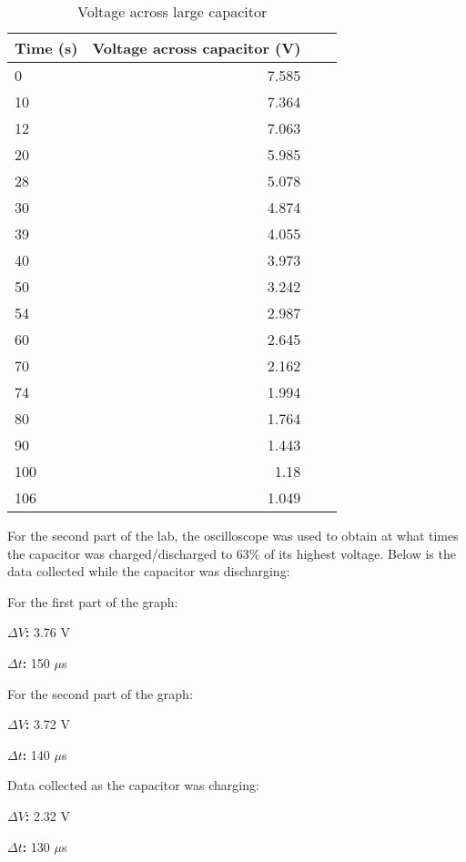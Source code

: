 \documentclass [12pt, letterpaper, twoside] {article}
\begin{document}
\begin{table}
  \centering
  \begin{tabular}{| l | r | r | r |}
    \hline\hline
    Time (s) & Voltage across capacitor (V) \\
    \hline
    0 & 7.585 \\
    \hline
    10 & 7.364 \\
    \hline
    12 & 7.063 \\
    \hline
    20 & 5.985 \\
    \hline
    28 & 5.078 \\
    \hline
    30 & 4.874 \\
    \hline
    39 & 4.055 \\
    \hline
    40 & 3.973 \\
    \hline
    50 & 3.242 \\
    \hline
    54 & 2.987 \\
    \hline
    60 & 2.645 \\
    \hline
    70 & 2.162 \\
    \hline
    74 & 1.994 \\
    \hline
    80 & 1.764 \\
    \hline
    90 & 1.443 \\
    \hline
    100 & 1.18 \\
    \hline
    106 & 1.049 \\
    \hline\hline
  \end{tabular}
  \caption{Voltage across large capacitor}
\end{table}

\noindent
For the second part of the lab, the oscilloscope was used to obtain at what times the capacitor was charged/discharged to 63\% of its highest voltage. Below is the data collected while the capacitor was discharging:

\noindent
For the first part of the graph:

\textbf{\(\Delta{V}\):} 3.76 V

\textbf{\(\Delta{t}\):} 150 \(\mu\)s

\noindent
For the second part of the graph:

\textbf{\(\Delta{V}\):} 3.72 V

\textbf{\(\Delta{t}\):} 140 \(\mu\)s

\noindent
Data collected as the capacitor was charging:

\textbf{\(\Delta{V}\):} 2.32 V

\textbf{\(\Delta{t}\):} 130 \(\mu\)s
\end{document}
